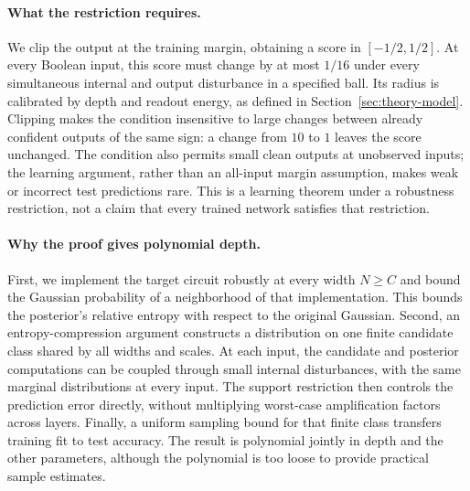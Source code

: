 \documentclass[11pt]{article}
\begin{document}
\paragraph{What the restriction requires.}
We clip the output at the training margin, obtaining a score in
$[-1/2,1/2]$. At every Boolean input, this score must change by at most
$1/16$ under every simultaneous internal and output disturbance in a
specified ball. Its radius is calibrated by depth and readout energy,
as defined in Section~\ref{sec:theory-model}. Clipping makes the condition
insensitive to large changes between already confident outputs of the
same sign: a change from $10$ to $1$ leaves the score unchanged. The
condition also permits small clean outputs at unobserved inputs; the
learning argument, rather than an all-input margin assumption, makes
weak or incorrect test predictions rare. This is a learning theorem
under a robustness restriction, not a claim that every trained network
satisfies that restriction.

\paragraph{Why the proof gives polynomial depth.}
First, we implement the target circuit robustly at every width $N\ge C$
and bound the Gaussian probability of a neighborhood of that
implementation. This bounds the posterior's relative entropy with
respect to the original Gaussian. Second, an entropy-compression argument
constructs a distribution on one finite candidate class shared by all
widths and scales. At each input, the candidate and posterior computations
can be coupled through small internal disturbances, with the same
marginal distributions at every input. The support restriction then
controls the prediction error directly, without multiplying
worst-case amplification factors across layers. Finally, a uniform
sampling bound for that finite class transfers training fit to test
accuracy. The result is polynomial jointly in depth and the other
parameters, although the polynomial is too loose to provide practical
sample estimates.
\end{document}
